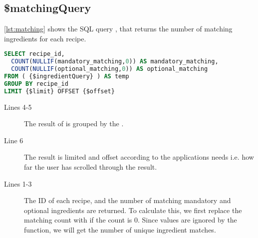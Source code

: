 \subsection*{\$matchingQuery}
\autoref{lst:matching} shows the SQL query , that returns the number of matching ingredients for each recipe.
\begin{lstlisting}[language=SQL, morekeywords={OFFSET}, float=h, label={lst:matching}, caption={\$matchingQuery, returns the matching ingredients count for each recipe.}]
SELECT recipe_id,
  COUNT(NULLIF(mandatory_matching,0)) AS mandatory_matching,
  COUNT(NULLIF(optional_matching,0)) AS optional_matching
FROM ( {$ingredientQuery} ) AS temp
GROUP BY recipe_id
LIMIT {$limit} OFFSET {$offset}
\end{lstlisting}
\begin{description}
\item[Lines 4-5] The result of  is grouped by the .
\item[Line 6] The result is limited and offset according to the applications needs i.e. how far the user has scrolled through the result.
\item[Lines 1-3] The ID of each recipe, and the number of matching mandatory and optional ingredients are returned. To calculate this, we first replace the matching count with  if the count is 0. Since  values are ignored by the  function, we will get the number of unique ingredient matches.
\end{description}




